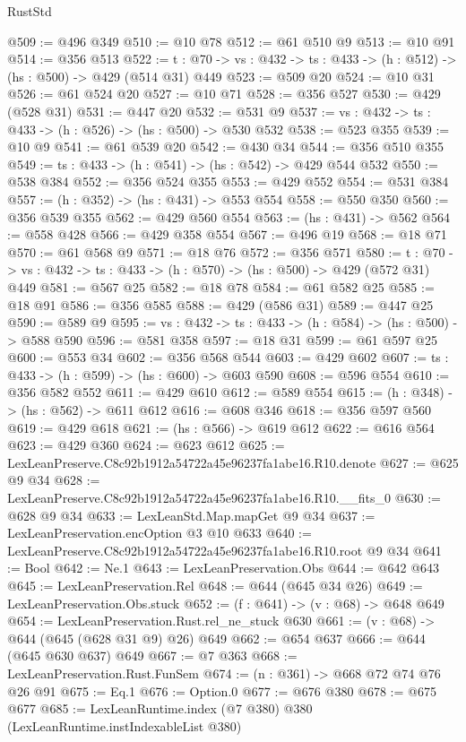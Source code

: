 \begin{lexlean}{RustStd}
\begin{coremodule}
@509 := @496 @349
@510 := @10 @78
@512 := @61 @510 @9
@513 := @10 @91
@514 := @356 @513
@522 := {t : @70} -> {vs : @432} -> {ts : @433} -> (h : @512) -> (hs : @500) -> @429 (@514 @31) @449
@523 := @509 @20
@524 := @10 @31
@526 := @61 @524 @20
@527 := @10 @71
@528 := @356 @527
@530 := @429 (@528 @31)
@531 := @447 @20
@532 := @531 @9
@537 := {vs : @432} -> {ts : @433} -> (h : @526) -> (hs : @500) -> @530 @532
@538 := @523 @355
@539 := @10 @9
@541 := @61 @539 @20
@542 := @430 @34
@544 := @356 @510 @355
@549 := {ts : @433} -> (h : @541) -> (hs : @542) -> @429 @544 @532
@550 := @538 @384
@552 := @356 @524 @355
@553 := @429 @552
@554 := @531 @384
@557 := (h : @352) -> (hs : @431) -> @553 @554
@558 := @550 @350
@560 := @356 @539 @355
@562 := @429 @560 @554
@563 := (hs : @431) -> @562
@564 := @558 @428
@566 := @429 @358 @554
@567 := @496 @19
@568 := @18 @71
@570 := @61 @568 @9
@571 := @18 @76
@572 := @356 @571
@580 := {t : @70} -> {vs : @432} -> {ts : @433} -> (h : @570) -> (hs : @500) -> @429 (@572 @31) @449
@581 := @567 @25
@582 := @18 @78
@584 := @61 @582 @25
@585 := @18 @91
@586 := @356 @585
@588 := @429 (@586 @31)
@589 := @447 @25
@590 := @589 @9
@595 := {vs : @432} -> {ts : @433} -> (h : @584) -> (hs : @500) -> @588 @590
@596 := @581 @358
@597 := @18 @31
@599 := @61 @597 @25
@600 := @553 @34
@602 := @356 @568 @544
@603 := @429 @602
@607 := {ts : @433} -> (h : @599) -> (hs : @600) -> @603 @590
@608 := @596 @554
@610 := @356 @582 @552
@611 := @429 @610
@612 := @589 @554
@615 := (h : @348) -> (hs : @562) -> @611 @612
@616 := @608 @346
@618 := @356 @597 @560
@619 := @429 @618
@621 := (hs : @566) -> @619 @612
@622 := @616 @564
@623 := @429 @360
@624 := @623 @612
@625 := LexLeanPreserve.C8c92b1912a54722a45e96237fa1abe16.R10.denote
@627 := @625 @9 @34
@628 := LexLeanPreserve.C8c92b1912a54722a45e96237fa1abe16.R10.__fits_0
@630 := @628 @9 @34
@633 := LexLeanStd.Map.mapGet @9 @34
@637 := LexLeanPreservation.encOption @3 @10 @633
@640 := LexLeanPreserve.C8c92b1912a54722a45e96237fa1abe16.R10.root @9 @34
@641 := Bool
@642 := Ne.{1}
@643 := LexLeanPreservation.Obs
@644 := @642 @643
@645 := LexLeanPreservation.Rel
@648 := @644 (@645 @34 @26)
@649 := LexLeanPreservation.Obs.stuck
@652 := (f : @641) -> (v : @68) -> @648 @649
@654 := LexLeanPreservation.Rust.rel_ne_stuck @630
@661 := (v : @68) -> @644 (@645 (@628 @31 @9) @26) @649
@662 := @654 @637
@666 := @644 (@645 @630 @637) @649
@667 := @7 @363
@668 := LexLeanPreservation.Rust.FunSem
@674 := (n : @361) -> @668 @72 @74 @76 @26 @91
@675 := Eq.{1}
@676 := Option.{0}
@677 := @676 @380
@678 := @675 @677
@685 := LexLeanRuntime.index (@7 @380) @380 (LexLeanRuntime.instIndexableList @380)

\end{coremodule}
\end{lexlean}
